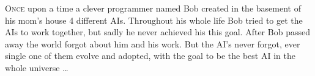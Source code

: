 \clearpage
\vspace*{\fill}
\begin{center}
\begin{minipage}{1.0\textwidth}
\textsc{Once} upon a time a clever programmer named Bob created in the basement of his mom's house 4 different AIs. Throughout his whole life Bob tried to get the AIs to work together, but sadly he never achieved his this goal. After Bob passed away the world forgot about him and his work. But the AI's never forgot, ever single one of them evolve and adopted, with the goal to be the best AI in the whole universe \ldots
\end{minipage}
\end{center}
\vfill %
\clearpage
